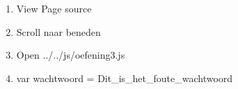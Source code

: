 \begin{enumerate}
  \item View Page source
  \item Scroll naar beneden
  \item Open ../../js/oefening3.js
  \item var wachtwoord = Dit\_is\_het\_foute\_wachtwoord
\end{enumerate}